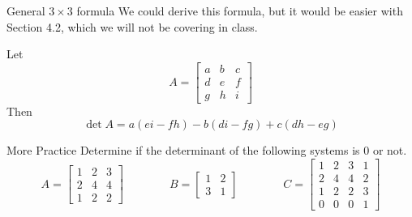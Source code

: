 \documentclass[xcoler=dvipsnames, aspectratio=169]{beamer}
\begin{document}
    \iftoggle{showSolutions}{
        \begin{frame}{$a\neq0$ case}
            \begin{proof}
                If $a\neq0$, we just need to eliminate $c$!
                \pause
                \[
                    A = \aMat{cc}{
                        a & b\\
                        c & d
                    }\pause\xrightarrow{R_2 = R_2 - \frac{c}{a}R_1}\aMat{cc}{
                        a & b\\
                        0 & d-\frac{bc}{a}
                    } = B
                \]
                See that $\det{A} = \det{B} = a\left(d-\frac{bc}{a}\right)\pause = ad - bc$.
            \end{proof}
        \end{frame}
    }{}
    \begin{frame}{General $3\times 3$ formula}
        We could derive this formula, but it would be easier with Section 4.2, which we will not
        be covering in class.\pause
        \begin{theorem}
        Let
        \[
            A = \begin{bmatrix}
                a & b & c\\
                d & e & f\\
                g & h & i
            \end{bmatrix}
        \]
        Then
        \[
            \det{A} = a(ei-fh) - b(di-fg) + c(dh-eg)
        \]
        \end{theorem}
    \end{frame}
    \begin{frame}{More Practice}
        Determine if the determinant of the following systems is $0$ or not.
        \[
            A = \begin{bmatrix}
                1 & 2 & 3\\
                2 & 4 & 4\\
                1 & 2 & 2
            \end{bmatrix}\qquad\qquad B = \begin{bmatrix}
                1 & 2\\
                3 & 1
            \end{bmatrix}\qquad\qquad C = \begin{bmatrix}
                1 & 2 & 3 & 1\\
                2 & 4 & 4 & 2\\
                1 & 2 & 2 & 3\\
                0 & 0 & 0 & 1
            \end{bmatrix}
        \]
        \vspace{130pt}
    \end{frame}
\end{document}
